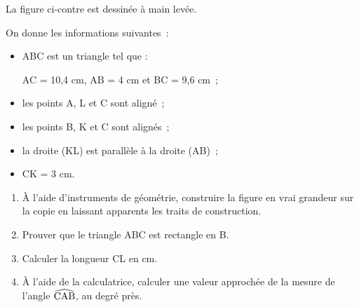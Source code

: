 \documentclass[exercice]{thedocument}%
\begin{document}
%
    \begin{minipage}[c]{.5\linewidth}
        La figure ci-contre est dessinée à main levée.\par\noindent
        On donne les informations suivantes~:
        \begin{itemize}
            \item ABC est un triangle tel que :\par
            AC = 10,4 cm, AB = 4 cm et BC = 9,6 cm~;
            \item les points A, L et C sont aligné~;
            \item les points B, K et C sont alignés~;
            \item la droite (KL) est parallèle à la droite (AB)~;
            \item CK = 3 cm.
        \end{itemize}
    \end{minipage}\hfill
    \begin{minipage}[c]{.4\linewidth}
    \end{minipage}\par
    \begin{enumerate}
        \item À l'aide d'instruments de géométrie, construire la figure en vrai
        grandeur sur la copie en laissant apparents les traits de construction.
        \item Prouver que le triangle ABC est rectangle en B.
        \item Calculer la longueur CL en cm.
        \item À l'aide de la calculatrice, calculer une valeur approchée de la
        mesure de l'angle $\widehat{\text{CAB}}$, au degré près.
    \end{enumerate}
    \showthesource
\end{document}
